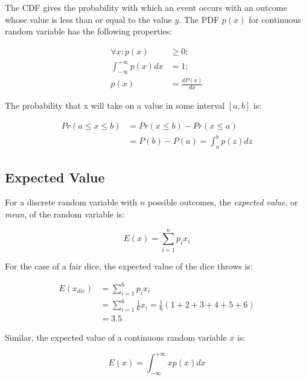 The CDF gives the probability with which an event occurs with an outcome whose value is less than or equal to the value $y$. The PDF $p(x)$ for continuous random variable has the following properties:

\begin{equation}
	\begin{aligned}
		\forall x: p(x)&\geq 0;\\
		\int_{-\infty}^{+\infty}p(x)dx&=1;\\
		p(x)&=\frac{dP(x)}{dx}
	\end{aligned}
\end{equation}

The probability that x will take on a value in some interval $[a,b]$ is:

\begin{equation}
	\begin{aligned}
		Pr(a\leq x\leq b)&=Pr(x\leq b)-Pr(x\leq a)\\
		&=P(b)-P(a)=\int_{a}^{b}p(z)dz
	\end{aligned}
\end{equation} 



\subsection{Expected Value}
For a discrete random variable with $n$ possible outcomes, the \textit{expected value}, or \textit{mean}, of the random variable is:

\begin{equation}
	E(x)=\sum_{i=1}^{n}p_i x_i
\end{equation} 

For the case of a fair dice, the expected value of the dice throws is:

\begin{equation*}
	\begin{aligned}
		E(x_{die})&=\sum_{i=1}^{6}p_i x_i\\
		&=\sum_{i=1}^{6}\frac{1}{6}x_i =\frac{1}{6}(1+2+3+4+5+6)\\
		&=3.5
	\end{aligned}
\end{equation*}

Similar, the expected value of a continuous random variable $x$ is:

\begin{equation}
	E(x)=\int_{-\infty}^{+\infty}xp(x)dx
\end{equation}


